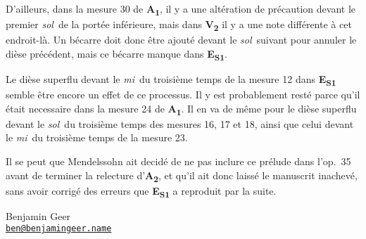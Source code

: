 \documentclass[a4paper, 12pt]{book}
\newcommand{\source}[2]{\textbf{#1\textsubscript{#2}}}
\begin{document}
{    D'ailleurs, dans la mesure 30 de \source{A}{1}, il y a une
    altération de précaution devant le premier \textit{sol}\na\ de la
    portée inférieure, mais dans \source{V}{2} il y a une note différente à
    cet endroit-là. Un bécarre doit donc être ajouté devant le
    \textit{sol}\na\ suivant pour annuler le dièse précédent, mais ce
    bécarre manque dans \source{E}{S1}.

    Le dièse superflu devant le \textit{mi}\sh\ du troisième temps de
    la mesure 12 dans \source{E}{S1} semble être encore un effet de ce
    processus.  Il y est probablement resté parce qu'il était
    necessaire dans la mesure 24 de \source{A}{1}. Il en va de même
    pour le dièse superflu devant le \textit{sol}\sh\ du troisième
    temps des mesures 16, 17 et 18, ainsi que celui devant le
    \textit{mi}\sh\ du troisième temps de la mesure 23.
    
    Il se peut que Mendelssohn ait decidé de ne pas inclure ce prélude
    dans l'op.\ 35 avant de terminer la relecture d'\source{A}{2}, et
    qu'il ait donc laissé le manuscrit inachevé, sans avoir corrigé
    des erreurs que \source{E}{S1} a reproduit par la suite.
  } {}

\raggedbottom

\vspace{\baselineskip}

\hfill
\begin{minipage}[t]{0.55\textwidth}
  Benjamin Geer \\
  \href{mailto:ben@benjamingeer.name}{\smaller \texttt{ben@benjamingeer.name}}
\end{minipage}

\pagebreak
\cleardoublepage
\mainmatter

\ifdef{\performance}
      {}
      {}
\end{document}
